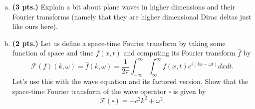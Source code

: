 \documentclass[12pt]{article} %
\begin{document}
\begin{problem}
\begin{enumerate}[(a)]
\item \textbf{(3 pts.)} Explain a bit about plane waves in higher dimensions and their Fourier transforms (namely that they are higher dimensional Dirac deltas just like ours here).

\item \textbf{(2 pts.)} Let us define a space-time Fourier transform by taking some function of space and time $f(x,t)$ and computing its Fourier transform $\hat{f}$ by 
\[
\mathcal{F}(f)(k,\omega) = \hat{f}(k,\omega) = \frac{1}{2\pi} \int_{-\infty}^\infty \int_{\infty}^\infty f(x,t) e^{i(kx-\omega t)} dxdt. 
\]
Let's use this with the wave equation and its factored version. Show that the space-time Fourier transform of the wave operator $\square$ is given by
\[
\mathcal{F}(\square) = -c^2k^2 + \omega^2.
\]
\end{enumerate}
\end{problem}
\end{document}
